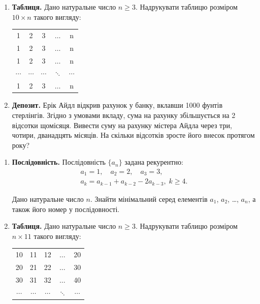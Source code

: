  


\begin{enumerate}
\item \textbf{Таблиця.} Дано натуральне число $n\geqslant 3$. Надрукувати таблицю розміром $10\times n$ такого вигляду:
{\ttfamily
\begin{center}
\setlength{\tabcolsep}{6pt}
\begin{tabular}{ccccc}
1 & 2 & 3 & $\ldots$ & n \\
1 & 2 & 3 & $\ldots$ & n \\
1 & 2 & 3 & $\ldots$ & n \\
$\cdots$ & $\cdots$ & $\cdots$ & $\ddots$ & $\cdots$ \\
1 & 2 & 3 & $\ldots$ & n
\end{tabular}
\end{center}
}
\item \textbf{Депозит.} Ерік Айдл відкрив рахунок у банку, вклавши 1000 фунтів стерлінгів. Згідно з умовами вкладу, сума на рахунку збільшується на 2 відсотки щомісяця. Вивести суму на рахунку містера Айдла через три, чотири, дванадцять місяців. На скільки відсотків зросте його внесок протягом року?
\end{enumerate}

 


\begin{enumerate}
\item \textbf{Послідовність.} Послідовність $\{a_n\}$ задана рекурентно:
\begin{gather*}
a_1=1,\quad a_2=2,\quad a_3=3,\\
a_k = a_{k-1}+a_{k-2}-2a_{k-3}, \; k\geqslant 4.
\end{gather*}

Дано натуральне число $n$. Знайти мінімальний серед елементів $a_1$, $a_2$, \ldots, $a_n$, а також його номер у пос\-лі\-до\-вно\-сті.
\item \textbf{Таблиця.} Дано натуральне число $n\geqslant 3$. Надрукувати таблицю розміром $n\times 11$ такого вигляду:
{\ttfamily
\begin{center}
\setlength{\tabcolsep}{6pt}
\begin{tabular}{ccccc}
10 & 11 & 12 & $\ldots$ & 20 \\
20 & 21 & 22 & $\ldots$ & 30 \\
30 & 31 & 32 & $\ldots$ & 40  \\
$\cdots$ & $\cdots$ & $\cdots$ & $\ddots$ & $\cdots$ \\
\end{tabular}
\end{center}
}
\end{enumerate}

